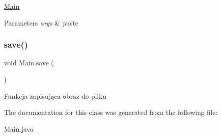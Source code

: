 \hyperlink{classMain}{Main} 
\begin{DoxyParams}{Parameters}
{\em args} & puste \\
\hline
\end{DoxyParams}
\mbox{\label{classMain_a38db5baccd60e4fc73197f5b052af93f}} 
\subsubsection{\texorpdfstring{save()}{save()}}
{\footnotesize\ttfamily void Main.\+save (\begin{DoxyParamCaption}{ }\end{DoxyParamCaption})\hspace{0.3cm}{\ttfamily [inline]}}

Funkcja zapisująca obraz do pliku 

The documentation for this class was generated from the following file\+:\begin{DoxyCompactItemize}
\item 
Main.\+java\end{DoxyCompactItemize}
